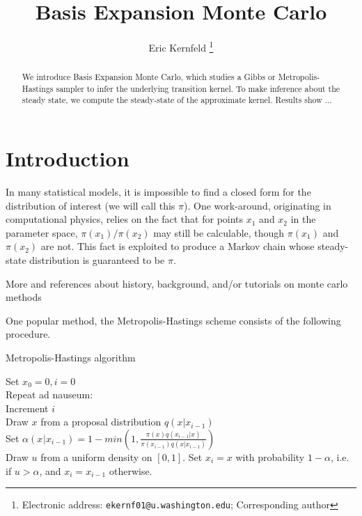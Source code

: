 \documentclass{article}
\begin{document}
\title{Basis Expansion Monte Carlo}

\author{Eric Kernfeld
  \thanks{Electronic address: \texttt{ekernf01@u.washington.edu}; Corresponding author}}
\maketitle

\begin{abstract}
We introduce Basis Expansion Monte Carlo, which studies a Gibbs or Metropolis-Hastings sampler to infer the underlying transition kernel. To make inference about the steady state, we compute the steady-state of the approximate kernel. Results show ...
\end{abstract}


\section{Introduction}
In many statistical models, it is impossible to find a closed form for the distribution of interest (we will call this $\pi$). One work-around, originating in computational physics, relies on the fact that for points $x_1$ and $x_2$ in the parameter space, $\pi(x_1)/\pi(x_2)$ may still be calculable, though $\pi(x_1)$ and $\pi(x_2)$ are not. This fact is exploited to produce a Markov chain whose steady-state distribution is guaranteed to be $\pi$. 

More and references about history, background, and/or tutorials on monte carlo methods



One popular method, the Metropolis-Hastings scheme consists of the following procedure.

\begin{algorithm}[h]
\caption{Metropolis-Hastings algorithm}
Set $x_0 = 0, i=0$\\
Repeat ad nauseum:\\
\Indp
Increment $i$\\
Draw $x$ from a proposal distribution $q(x|x_{i-1})$\\
Set $\alpha(x_{}|x_{i-1}) = 1 - min(1, \frac{\pi(x)q(x_{i-1}|x)}{\pi(x_{i-1})q(x|x_{i-1})})$\\
Draw $u$ from a uniform density on $[0,1]$.
Set $x_i = x$ with probability $1 - \alpha$, i.e. if $u >\alpha$, and $x_i = x_{i-1}$ otherwise.\\
\end{algorithm}
\end{document}
